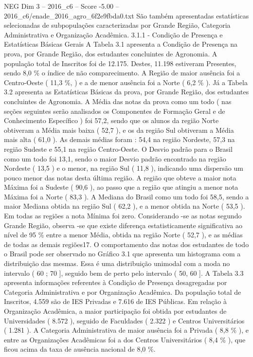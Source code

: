 \begin{textsample}{NEG Dim 3 – 2016\_c6 – Score -5.00 – 2016\_c6/enade\_2016\_agro\_6f2e9fbda0.txt}
São também apresentadas estatísticas selecionadas de subpopulações caracterizadas por Grande Região, Categoria Administrativa e Organização Acadêmica. 3.1.1 - Condição de Presença e Estatísticas Básicas Gerais A Tabela 3.1 apresenta a Condição de Presença na prova, por Grande Região, dos estudantes concluintes de Agronomia.
A população total de Inscritos foi de 12.175.
Destes, 11.198 estiveram Presentes, sendo 8,0 \% o índice de não comparecimento.
A Região de maior ausência foi a Centro-Oeste ( 11,3 \%, ) e a de menor ausência foi a Norte ( 6,2 \% ).
Já a Tabela 3.2 apresenta as Estatísticas Básicas da prova, por Grande Região, dos estudantes concluintes de Agronomia.
A Média das notas da prova como um todo ( nas seções seguintes serão analisados os Componentes de Formação Geral e de Conhecimento Específico ) foi 57,2, sendo que os alunos da região Norte obtiveram a Média mais baixa ( 52,7 ), e os da região Sul obtiveram a Média mais alta ( 61,0 ).
As demais médias foram : 54,4 na região Nordeste, 57,3 na região Sudeste e 55,1 na região Centro-Oeste.
O Desvio padrão para o Brasil como um todo foi 13,1, sendo o maior Desvio padrão encontrado na região Nordeste ( 13,5 ) e o menor, na região Sul ( 11,8 ), indicando uma dispersão um pouco menor das notas desta última região.
A região que obteve a maior nota Máxima foi a Sudeste ( 90,6 ), ao passo que a região que atingiu a menor nota Máxima foi a Norte ( 83,3 ).
A Mediana do Brasil como um todo foi 58,5, sendo a maior Mediana obtida na região Sul ( 62,2 ), e a menor obtida na Norte ( 53,5 ).
Em todas as regiões a nota Mínima foi zero.
Considerando -se as notas segundo Grande Região, observa -se que existe diferença estatisticamente significativa ao nível de 95 \% entre a menor Média, obtida na região Norte ( 52,7 ), e as médias de todas as demais regiões17.
O comportamento das notas dos estudantes de todo o Brasil pode ser observado no Gráfico 3.1 que apresenta um histograma com a distribuição das mesmas.
Essa é uma distribuição unimodal com a moda no intervalo ( 60 ; 70 ], seguido bem de perto pelo intervalo ( 50, 60 ].
A Tabela 3.3 apresenta informações referentes à Condição de Presença desagregadas por Categoria Administrativa e por Organização Acadêmica.
Da população total de Inscritos, 4.559 são de IES Privadas e 7.616 de IES Públicas.
Em relação à Organização Acadêmica, a maior participação foi obtida por estudantes de Universidades ( 8.572 ), seguido de Faculdades ( 2.322 ) e Centros Universitários ( 1.281 ).
A Categoria Administrativa de maior ausência foi a Privada ( 8,8 \% ), e entre as Organizações Acadêmicas foi a dos Centros Universitários ( 8,4 \% ), que ficou acima da taxa de ausência nacional de 8,0 \%.

\end{textsample}
